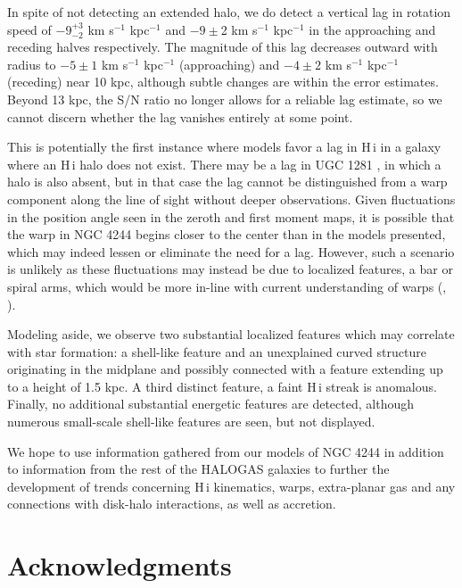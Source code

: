 \documentclass{emulateapj}
\begin{document}
\par     
     In spite of not detecting an extended halo, we do detect a vertical lag in rotation speed of $-9^{+3}_{-2}$ km s$^{-1}$ kpc$^{-1}$ and $-9\pm$2 km s$^{-1}$ kpc$^{-1}$ in the approaching and receding halves respectively. The magnitude of this lag decreases outward with radius to $-5\pm 1$ km s$^{-1}$ kpc$^{-1}$ (approaching) and $-4\pm 2$ km s$^{-1}$ kpc$^{-1}$ (receding) near 10 kpc, although subtle changes are within the error estimates.  Beyond 13 kpc, the S/N ratio no longer allows for a reliable lag estimate, so we cannot discern whether the lag vanishes entirely at some point.  

\par
     This is potentially the first instance where models favor a lag in {\sc H\,i} in a galaxy where an {\sc H\,i} halo does not exist.   There may be a lag in UGC 1281 \citep{2011arXiv1103.0699K}, in which a halo is also absent, but in that case the lag cannot be distinguished from a warp component along the line of sight without deeper observations.  Given fluctuations in the position angle seen in the zeroth and first moment maps, it is possible that the warp in NGC 4244 begins closer to the center than in the models presented, which may indeed lessen or eliminate the need for a lag.  However, such a scenario is unlikely as these fluctuations may instead be due to localized features, a bar or spiral arms, which would be more in-line with current understanding of warps (\citealt{1990ApJ...352...15B}, \citealt{2011arXiv1101.1771V}).

\par
     Modeling aside, we observe two substantial localized features which may correlate with star formation:  a shell-like feature and an unexplained curved structure originating in the midplane and possibly connected with a feature extending up to a height of 1.5 kpc.  A third distinct feature, a faint {\sc H\,i} streak is anomalous.  Finally, no additional substantial energetic features are detected, although numerous small-scale shell-like features are seen, but not displayed.

\par
     We hope to use information gathered from our models of NGC 4244 in addition to information from the rest of the HALOGAS galaxies to further the development of trends concerning {\sc H\,i} kinematics, warps, extra-planar gas and any connections with disk-halo interactions, as well as accretion.
    

\section{Acknowledgments} \label{Section8}
\end{document}
